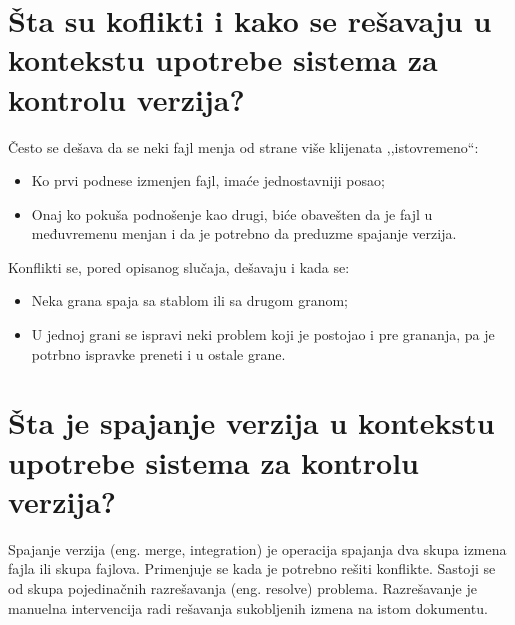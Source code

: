 \documentclass[a4paper]{article}
\begin{document}
\section{Šta su koflikti i kako se rešavaju u kontekstu upotrebe sistema za kontrolu verzija?}
  \noindent Često se dešava da se neki fajl menja od strane više klijenata ,,istovremeno``:
  \begin{itemize}
    \item Ko prvi podnese izmenjen fajl, imaće jednostavniji posao;
    \item Onaj ko pokuša podnošenje kao drugi, biće obavešten da je fajl u međuvremenu 
          menjan i da je potrebno da preduzme spajanje verzija.
  \end{itemize}
  Konflikti se, pored opisanog slučaja, dešavaju i kada se:
  \begin{itemize}
    \item Neka grana spaja sa stablom ili sa drugom granom;
    \item U jednoj grani se ispravi neki problem koji je postojao i pre grananja, 
          pa je potrbno ispravke preneti i u ostale grane.
  \end{itemize}
\section{Šta je spajanje verzija u kontekstu upotrebe sistema za kontrolu verzija?}
  Spajanje verzija (eng. merge, integration) je operacija spajanja dva skupa izmena fajla ili 
  skupa fajlova. Primenjuje se kada je potrebno rešiti konflikte. Sastoji se od skupa pojedinačnih 
  razrešavanja (eng. resolve) problema. Razrešavanje je manuelna intervencija radi rešavanja 
  sukobljenih izmena na istom dokumentu.
  
\end{document}
